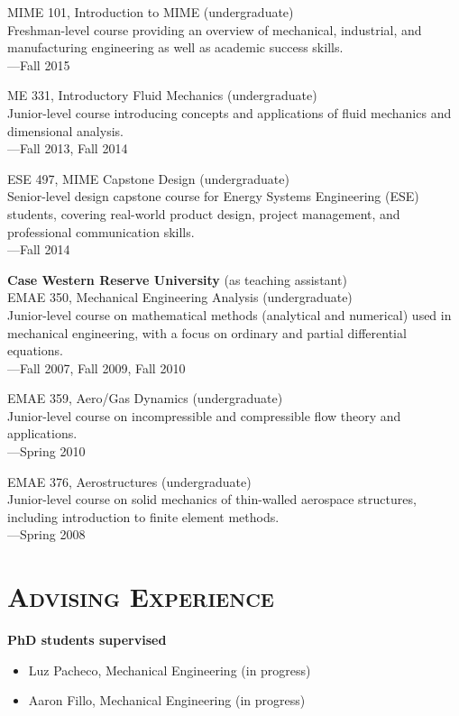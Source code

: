 \documentclass[margin,line,11pt]{res}
\begin{document}
\begin{resume}
MIME 101, Introduction to MIME (undergraduate) \\
Freshman-level course providing an overview of mechanical, industrial, and manufacturing engineering as well as academic success skills. \\
---Fall 2015

ME 331, Introductory Fluid Mechanics (undergraduate) \\
Junior-level course introducing concepts and applications of fluid mechanics and dimensional analysis. \\
---Fall 2013, Fall 2014

ESE 497, MIME Capstone Design (undergraduate) \\
Senior-level design capstone course for Energy Systems Engineering (ESE) students, covering real-world product design, project management, and professional communication skills. \\
---Fall 2014

\textbf{Case Western Reserve University} (as teaching assistant) \\
EMAE 350, Mechanical Engineering Analysis (undergraduate) \\
Junior-level course on mathematical methods (analytical and numerical) used in mechanical engineering, with a focus on ordinary and partial differential equations. \\
---Fall 2007, Fall 2009, Fall 2010

EMAE 359, Aero\slash Gas Dynamics (undergraduate) \\
Junior-level course on incompressible and compressible flow theory and applications. \\
---Spring 2010

EMAE 376, Aerostructures (undergraduate) \\
Junior-level course on solid mechanics of thin-walled aerospace structures, including introduction to finite element methods. \\
---Spring 2008

\section{\textsc{Advising Experience}}

\textbf{PhD students supervised}
\begin{itemize}[leftmargin=*]
    \item Luz Pacheco, Mechanical Engineering (in progress)
    \item Aaron Fillo, Mechanical Engineering (in progress)
\end{itemize}


\end{resume}
\end{document}
